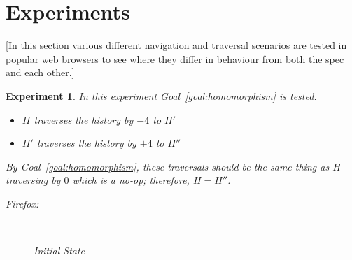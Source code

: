 \documentclass{article}
\newcommand{\aNH}{H}
\newtheorem{experiment}{Experiment}
\begin{document}
\section{Experiments}

[In this section various different navigation and traversal scenarios are tested in popular web browsers to see where they differ in behaviour from both the spec and each other.]

\begin{experiment}
  In this experiment Goal~\ref{goal:homomorphism} is tested.
  \begin{itemize}
    \item \emph{$\aNH$ traverses the history by $-4$ to $\aNH'$}
    \item \emph{$\aNH'$ traverses the history by $+4$ to $\aNH''$}
  \end{itemize}
  By Goal~\ref{goal:homomorphism}, these traversals should be the same thing as \emph{$\aNH$ traversing by $0$} which is a no-op; therefore, $\aNH = \aNH''$.

  Firefox:
  \begin{figure}[H]
    ~
    \caption{Initial State}
  \end{figure}


\end{experiment}
\end{document}
